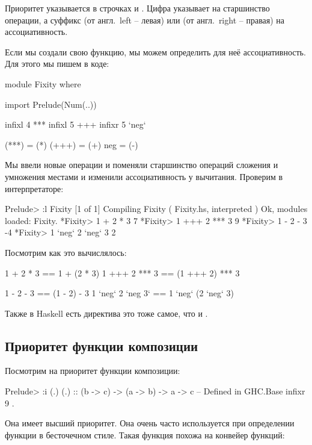 Приоритет указывается в строчках  и .
Цифра указывает на старшинство операции, а суффикс  
(от англ.~left -- левая) или  (от англ.~right -- правая)
на ассоциативность. 

Если мы создали свою функцию, мы можем определить для 
неё ассоциативность. Для этого мы пишем в коде:

\begin{code}
module Fixity where

import Prelude(Num(..))

infixl 4 *** 
infixl 5 +++
infixr 5 `neg`

(***) = (*)
(+++) = (+)
neg   = (-)
\end{code}

Мы ввели новые операции и поменяли старшинство операций
сложения и умножения местами и изменили ассоциативность 
у вычитания. Проверим в интерпретаторе:

\begin{code}
Prelude> :l Fixity
[1 of 1] Compiling Fixity           ( Fixity.hs, interpreted )
Ok, modules loaded: Fixity.
*Fixity> 1 + 2 * 3
7
*Fixity> 1 +++ 2 *** 3
9
*Fixity> 1 - 2 - 3
-4
*Fixity> 1 `neg` 2 `neg` 3
2
\end{code}

Посмотрим как это вычислялось:

\begin{code}
1   +   2   *  3  ==   1   +   (2    *   3)
1  +++  2  *** 3  ==  (1  +++   2)  ***  3

1   -   2   -  3  ==  (1   -    2)   -   3
1 `neg` 2 `neg 3` ==   1 `neg` (2  `neg` 3)
\end{code}

Также в Haskell есть директива  это тоже самое, что и
.


\subsection{Приоритет функции композиции}

Посмотрим на приоритет функции композиции:

\begin{code}
Prelude> :i (.)
(.) :: (b -> c) -> (a -> b) -> a -> c 	-- Defined in GHC.Base
infixr 9 .
\end{code}

Она имеет высший приоритет. Она очень часто используется
при определении функции в бесточечном стиле. Такая функция 
похожа на конвейер функций:

